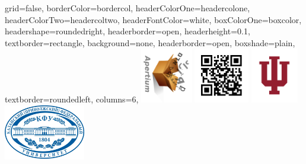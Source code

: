 \documentclass[fontscale=0.3,landscape,paperwidth=72in,paperheight=36in]{baposter}  %
\begin{document}
	\begin{poster}{
			grid=false,
			borderColor=bordercol,
			headerColorOne=headercolone,
			headerColorTwo=headercoltwo,
			headerFontColor=white,
			boxColorOne=boxcolor,
			headershape=roundedright,
  headerborder=open,
  headerheight=0.1\textheight,
			textborder=rectangle,
			background=none,
			headerborder=open,
			boxshade=plain,
			textborder=roundedleft,
			columns=6,
		}{
			\includegraphics[angle=90,height=6.5em]{apertium5b}%
				\hspace{1cm}\includegraphics[height=6.5em]{22888536}
				\hspace{1cm}\includegraphics[height=6.5em]{iu_tab}
				\hspace{1cm}\includegraphics[height=6.5em]{kfu}
}
\end{poster}
\end{document}
